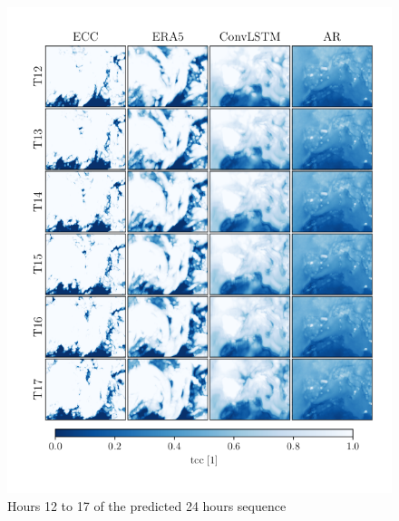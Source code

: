 \begin{figure}[ht]
    \centering
    \includegraphics{python_figs/comparing_seq_part_3_of4_jan2.png}
    \caption{Hours 12 to 17 of the predicted 24 hours sequence }
    \label{fig:part3/4}
\end{figure}
